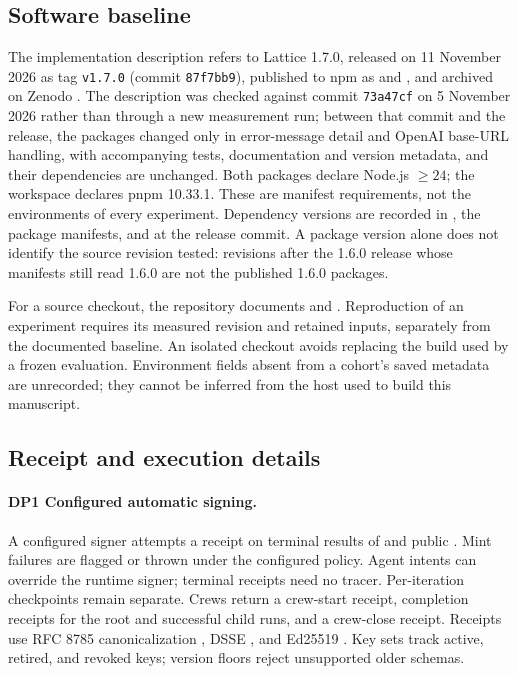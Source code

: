 \subsection{Software baseline}\label{app:software-baseline}

{\setlength{\emergencystretch}{3em}The implementation description refers to Lattice 1.7.0, released on 11 November 2026 as tag \texttt{v1.7.0} (commit \texttt{87f7bb9}), published to npm as  and , and archived on Zenodo \citep{lattice}. The description was checked against commit \texttt{73a47cf} on 5 November 2026 rather than through a new measurement run; between that commit and the release, the packages changed only in error-message detail and OpenAI base-URL handling, with accompanying tests, documentation and version metadata, and their dependencies are unchanged. Both packages declare Node.js $\geq 24$; the workspace declares pnpm 10.33.1. These are manifest requirements, not the environments of every experiment. Dependency versions are recorded in , the package manifests,  and  at the release commit. A package version alone does not identify the source revision tested: revisions after the 1.6.0 release whose manifests still read 1.6.0 are not the published 1.6.0 packages.\par}

For a source checkout, the repository documents  and . Reproduction of an experiment requires its measured revision and retained inputs, separately from the documented baseline. An isolated checkout avoids replacing the build used by a frozen evaluation. Environment fields absent from a cohort's saved metadata are unrecorded; they cannot be inferred from the host used to build this manuscript.

\subsection{Receipt and execution details}\label{app:receipt-details}

\paragraph{DP1 Configured automatic signing.} A configured signer attempts a receipt on terminal results of  and public . Mint failures are flagged or thrown under the configured policy. Agent intents can override the runtime signer; terminal receipts need no tracer. Per-iteration checkpoints remain separate. Crews return a crew-start receipt, completion receipts for the root and successful child runs, and a crew-close receipt. Receipts use RFC 8785 canonicalization \citep{rfc8785}, DSSE \citep{dsse}, and Ed25519 \citep{rfc8032,bernstein2012}. Key sets track active, retired, and revoked keys; version floors reject unsupported older schemas.

